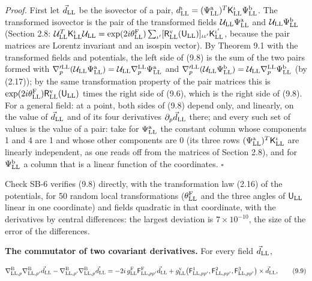 \documentclass[
  10pt,
]{article}
\begin{document}
\emph{Proof.} First let \(\vec d_{\rm LL}\) be the isovector of a pair,
\(d^\iota_{\rm LL}=(\Psi^{\rm a}_{\rm LL})^T\mathsf K^\iota_{\rm LL}\Psi^{\rm b}_{\rm LL}\).
The transformed isovector is the pair of the transformed fields
\(\mathcal U_{\rm LL}\Psi^{\rm a}_{\rm LL}\) and
\(\mathcal U_{\rm LL}\Psi^{\rm b}_{\rm LL}\) (Section 2.8:
\(\mathcal U^T_{\rm LL}\mathsf K^\iota_{\rm LL}\mathcal U_{\rm LL}=\exp(2i\theta^{\rm F}_{\rm LL})\sum_{\iota'}[\mathsf R^{\rm v}_{\rm LL}(\mathsf U_{\rm LL})]_{\iota\iota'}\mathsf K^{\iota'}_{\rm LL}\),
because the pair matrices are Lorentz invariant and an isospin vector).
By Theorem 9.1 with the transformed fields and potentials, the left side
of (9.8) is the sum of the two pairs formed with
\(\nabla'^{\rm LL}_p(\mathcal U_{\rm LL}\Psi^{\rm a}_{\rm LL})=\mathcal U_{\rm LL}\nabla^{\rm LL}_p\Psi^{\rm a}_{\rm LL}\)
and
\(\nabla'^{\rm LL}_p(\mathcal U_{\rm LL}\Psi^{\rm b}_{\rm LL})=\mathcal U_{\rm LL}\nabla^{\rm LL}_p\Psi^{\rm b}_{\rm LL}\)
(by (2.17)); by the same transformation property of the pair matrices
this is
\(\exp(2i\theta^{\rm F}_{\rm LL})\mathsf R^{\rm v}_{\rm LL}(\mathsf U_{\rm LL})\)
times the right side of (9.6), which is the right side of (9.8). For a
general field: at a point, both sides of (9.8) depend only, and
linearly, on the value of \(\vec d_{\rm LL}\) and of its four
derivatives \(\partial_p\vec d_{\rm LL}\) there; and every such set of
values is the value of a pair: take for \(\Psi^{\rm a}_{\rm LL}\) the
constant column whose components 1 and 4 are 1 and whose other
components are 0 (its three rows
\((\Psi^{\rm a}_{\rm LL})^T\mathsf K^\iota_{\rm LL}\) are linearly
independent, as one reads off from the matrices of Section 2.8), and for
\(\Psi^{\rm b}_{\rm LL}\) a column that is a linear function of the
coordinates. \(\square\)

Check SB-6 verifies (9.8) directly, with the transformation law (2.16)
of the potentials, for 50 random local transformations
(\(\theta^{\rm F}_{\rm LL}\) and the three angles of
\(\mathsf U_{\rm LL}\) linear in one coordinate) and fields quadratic in
that coordinate, with the derivatives by central differences: the
largest deviation is \(7\times10^{-10}\), the size of the error of the
differences.

\textbf{The commutator of two covariant derivatives.} For every field
\(\vec d_{\rm LL}\),

\[\nabla^{\rm B}_{{\rm LL},p}\nabla^{\rm B}_{{\rm LL},p'}\vec d_{\rm LL}-\nabla^{\rm B}_{{\rm LL},p'}\nabla^{\rm B}_{{\rm LL},p}\vec d_{\rm LL}=-2i\,g^{\rm F}_{\rm LL}\mathsf F^{\rm F}_{{\rm LL},pp'}\vec d_{\rm LL}+g^{\rm v}_{\rm LL}\big(\mathsf F^1_{{\rm LL},pp'},\mathsf F^2_{{\rm LL},pp'},\mathsf F^3_{{\rm LL},pp'}\big)\times\vec d_{\rm LL},\tag{9.9}\]
\end{document}
